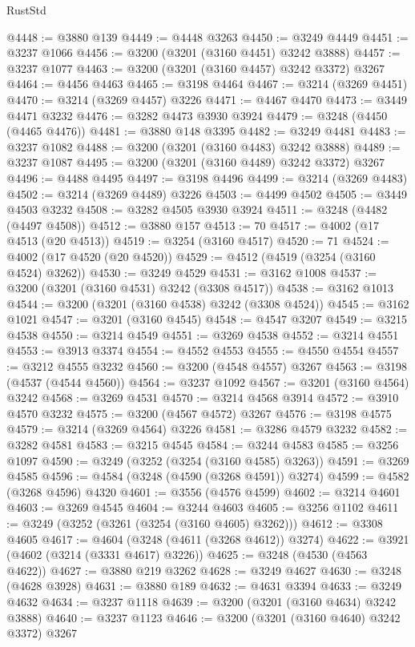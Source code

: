\begin{lexlean}{RustStd}
\begin{coremodule}
{\begin{coremodule}
{{{{{{{{{{{{{{{{{{{{{{{{{@4448 := @3880 @139
@4449 := @4448 @3263
@4450 := @3249 @4449
@4451 := @3237 @1066
@4456 := @3200 (@3201 (@3160 @4451) @3242 @3888)
@4457 := @3237 @1077
@4463 := @3200 (@3201 (@3160 @4457) @3242 @3372) @3267
@4464 := @4456 @4463
@4465 := @3198 @4464
@4467 := @3214 (@3269 @4451)
@4470 := @3214 (@3269 @4457) @3226
@4471 := @4467 @4470
@4473 := @3449 @4471 @3232
@4476 := @3282 @4473 @3930 @3924
@4479 := @3248 (@4450 (@4465 @4476))
@4481 := @3880 @148 @3395
@4482 := @3249 @4481
@4483 := @3237 @1082
@4488 := @3200 (@3201 (@3160 @4483) @3242 @3888)
@4489 := @3237 @1087
@4495 := @3200 (@3201 (@3160 @4489) @3242 @3372) @3267
@4496 := @4488 @4495
@4497 := @3198 @4496
@4499 := @3214 (@3269 @4483)
@4502 := @3214 (@3269 @4489) @3226
@4503 := @4499 @4502
@4505 := @3449 @4503 @3232
@4508 := @3282 @4505 @3930 @3924
@4511 := @3248 (@4482 (@4497 @4508))
@4512 := @3880 @157
@4513 := 70
@4517 := @4002 (@17 @4513 (@20 @4513))
@4519 := @3254 (@3160 @4517)
@4520 := 71
@4524 := @4002 (@17 @4520 (@20 @4520))
@4529 := @4512 (@4519 (@3254 (@3160 @4524) @3262))
@4530 := @3249 @4529
@4531 := @3162 @1008
@4537 := @3200 (@3201 (@3160 @4531) @3242 (@3308 @4517))
@4538 := @3162 @1013
@4544 := @3200 (@3201 (@3160 @4538) @3242 (@3308 @4524))
@4545 := @3162 @1021
@4547 := @3201 (@3160 @4545)
@4548 := @4547 @3207
@4549 := @3215 @4538
@4550 := @3214 @4549
@4551 := @3269 @4538
@4552 := @3214 @4551
@4553 := @3913 @3374
@4554 := @4552 @4553
@4555 := @4550 @4554
@4557 := @3212 @4555 @3232
@4560 := @3200 (@4548 @4557) @3267
@4563 := @3198 (@4537 (@4544 @4560))
@4564 := @3237 @1092
@4567 := @3201 (@3160 @4564) @3242
@4568 := @3269 @4531
@4570 := @3214 @4568 @3914
@4572 := @3910 @4570 @3232
@4575 := @3200 (@4567 @4572) @3267
@4576 := @3198 @4575
@4579 := @3214 (@3269 @4564) @3226
@4581 := @3286 @4579 @3232
@4582 := @3282 @4581
@4583 := @3215 @4545
@4584 := @3244 @4583
@4585 := @3256 @1097
@4590 := @3249 (@3252 (@3254 (@3160 @4585) @3263))
@4591 := @3269 @4585
@4596 := @4584 (@3248 (@4590 (@3268 @4591)) @3274)
@4599 := @4582 (@3268 @4596) @4320
@4601 := @3556 (@4576 @4599)
@4602 := @3214 @4601
@4603 := @3269 @4545
@4604 := @3244 @4603
@4605 := @3256 @1102
@4611 := @3249 (@3252 (@3261 (@3254 (@3160 @4605) @3262)))
@4612 := @3308 @4605
@4617 := @4604 (@3248 (@4611 (@3268 @4612)) @3274)
@4622 := @3921 (@4602 (@3214 (@3331 @4617) @3226))
@4625 := @3248 (@4530 (@4563 @4622))
@4627 := @3880 @219 @3262
@4628 := @3249 @4627
@4630 := @3248 (@4628 @3928)
@4631 := @3880 @189
@4632 := @4631 @3394
@4633 := @3249 @4632
@4634 := @3237 @1118
@4639 := @3200 (@3201 (@3160 @4634) @3242 @3888)
@4640 := @3237 @1123
@4646 := @3200 (@3201 (@3160 @4640) @3242 @3372) @3267
}}}}}}}}}}}}}}}}}}}}}}}}}
\end{coremodule}}
\end{coremodule}
\end{lexlean}
